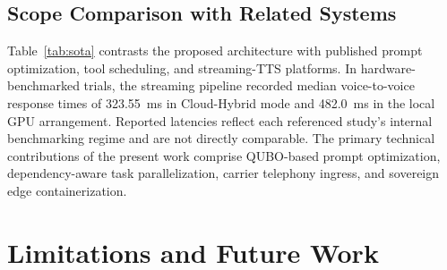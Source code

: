 \documentclass[review,12pt,times,authoryear]{elsarticle}
\theoremstyle{definition}
\begin{document}
\subsection{Scope Comparison with Related Systems}
Table~\ref{tab:sota} contrasts the proposed architecture with published prompt optimization, tool scheduling, and streaming-TTS platforms. In hardware-benchmarked trials, the streaming pipeline recorded median voice-to-voice response times of \SI{323.55}{\milli\second} in Cloud-Hybrid mode and \SI{482.0}{\milli\second} in the local GPU arrangement. Reported latencies reflect each referenced study's internal benchmarking regime and are not directly comparable. The primary technical contributions of the present work comprise QUBO-based prompt optimization, dependency-aware task parallelization, carrier telephony ingress, and sovereign edge containerization.

\section{Limitations and Future Work}
\label{sec:limitations}
\end{document}
